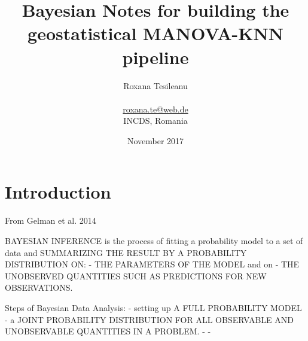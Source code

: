 \documentclass {article}
\title {Bayesian Notes for building the geostatistical MANOVA-KNN pipeline}
\date {November 2017}
\author {Roxana Tesileanu \\
\\
\href{mailto: roxana.te@web.de}{roxana.te@web.de} \\
INCDS, Romania}
\begin{document}
	\maketitle
\tableofcontents

\newpage
{}
\section {Introduction}

From Gelman et al. 2014

BAYESIAN INFERENCE is the process of fitting a probability model to a set of data and SUMMARIZING THE RESULT BY A PROBABILITY DISTRIBUTION ON:
- THE PARAMETERS OF THE MODEL and on
- THE UNOBSERVED QUANTITIES SUCH AS PREDICTIONS FOR NEW OBSERVATIONS.
 
Steps of Bayesian Data Analysis:
- setting up A FULL PROBABILITY MODEL - a JOINT PROBABILITY DISTRIBUTION FOR ALL OBSERVABLE AND UNOBSERVABLE QUANTITIES IN A PROBLEM. 
- 
-
\end{document}
